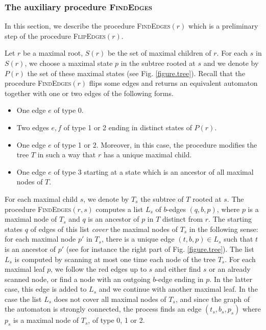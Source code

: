 \documentclass[11pt,a4paper]{article}
\def\T{{T}}
\begin{document}
\pagebreak
\subsubsection{The auxiliary procedure \textsc{FindEdges}} \label{section.auxiliary}

In this section, we describe the procedure \textsc{FindEdges}$(r)$
which is a preliminary step of the procedure \textsc{FlipEdges}$(r)$.

Let $r$ be a maximal root, $S(r)$ be the set of maximal children of
$r$. For each $s$ in $S(r)$, we choose a maximal state $p$ in the
subtree rooted at $s$ and we denote by $P(r)$ the set of these maximal
states (see Fig. \ref{figure.tree}). Recall that the procedure
\textsc{FindEdges}$(r)$ flips some edges and returns an equivalent
automaton together with one or two edges of the following forms.
\begin{itemize}
\item One edge $e$ of type 0.
\item Two edges $e,f$ of type 1 or 2 ending in distinct states of
  $P(r)$.
\item One edge $e$ of type 1 or 2.  Moreover, in this case, the
  procedure modifies the tree $\T$ in such a way that $r$ has a unique
  maximal child.
\item One edge $e$ of type 3 starting at a
  state which is an ancestor of all maximal nodes of $\T$.
\end{itemize} 

For each maximal child $s$, we denote by $T_s$ the subtree of $T$
rooted at $s$. The procedure \textsc{FindEdges}$(r,s)$ computes a
list $L_{s}$ of $b$-edges $(q,b,p)$, where $p$ is a maximal node of
$T_s$ and $q$ is an ancestor of $p$ in $T$ distinct from $r$. The
starting states $q$ of edges of this list \emph{cover} the maximal
nodes of $T_s$ in the following sense: for each maximal node $p'$ in
$T_s$, there is a unique edge $(t,b,p) \in L_s$ such that $t$ is an
ancestor of $p'$ (see for instance the right part of Fig.
\ref{figure.tree}). The list $L_s$ is computed by scanning at most one
time each node of the tree $T_s$. For each maximal leaf $p$, we
follow the red edges up to $s$ and either find $s$ or an already
scanned node, or find a node with an outgoing $b$-edge ending in
$p$. In the latter case, this edge is added to $L_s$ and we continue
with another maximal leaf. In the case the list $L_s$ does not cover
all maximal nodes of $T_s$, and since the graph of the automaton
is strongly connected, the process finds an edge $(t_s,b_s,p_s)$ where
$p_s$ is a maximal node of $T_s$, of type 0, 1 or 2.
\end{document}
